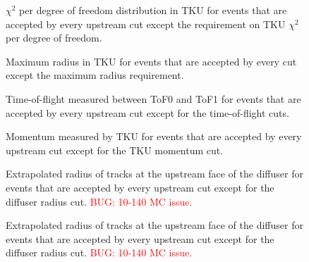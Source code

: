 \begin{figure}[!tbh]
    \centering
    {$\chi^2$ per degree of freedom distribution in TKU for events that are 
    accepted by every upstream cut except the requirement on TKU $\chi^2$ per 
    degree of freedom.\label{fig:tku_chi2}}
\end{figure}

\begin{figure}[!tbh]
    \centering
    {Maximum radius in TKU for events that are accepted by every cut except the 
     maximum radius requirement.\label{fig:tku_max_r}}
\end{figure}


\begin{figure}[!tbh]
    \centering
    {Time-of-flight measured between ToF0 and ToF1 for events that are accepted 
     by every upstream cut except for the time-of-flight cuts.\label{fig:tof01}}
\end{figure}

\begin{figure}[!tbh]
    \centering
    {Momentum measured by TKU for events that are accepted by every 
     upstream cut except for the TKU momentum cut. \label{fig:tku_mom}}
\end{figure}

\begin{figure}[!tbh]
    \centering
    {Extrapolated radius of tracks at the upstream face of the diffuser for 
     events that are accepted by every upstream cut except for the diffuser 
     radius cut. \textcolor{red}{BUG: 10-140 MC issue.} \label{fig:diffuser_us}}
\end{figure}

\begin{figure}[!tbh]
    \centering
   {Extrapolated radius of tracks at the upstream face of the diffuser for 
    events that are accepted by every upstream cut except for the diffuser 
    radius cut. \textcolor{red}{BUG: 10-140 MC issue.} \label{fig:diffuser_ds}}
\end{figure}

